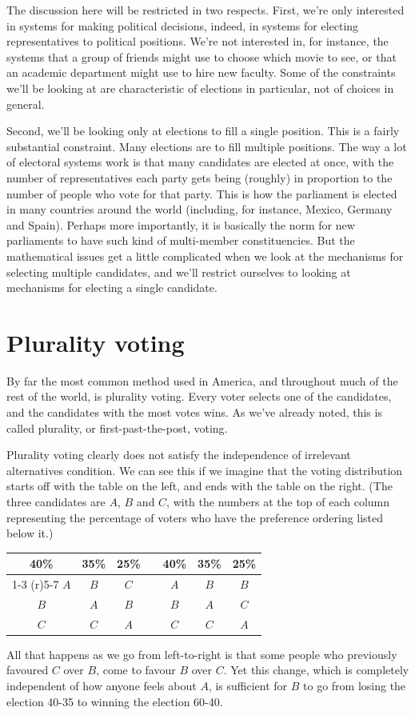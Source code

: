 \documentclass[openany]{book}
\begin{document}
The discussion here will be restricted in two respects. First, we're only interested in systems for making political decisions, indeed, in systems for electing representatives to political positions. We're not interested in, for instance, the systems that a group of friends might use to choose which movie to see, or that an academic department might use to hire new faculty. Some of the constraints we'll be looking at are characteristic of elections in particular, not of choices in general.

Second, we'll be looking only at elections to fill a single position. This is a fairly substantial constraint. Many elections are to fill multiple positions. The way a lot of electoral systems work is that many candidates are elected at once, with the number of representatives each party gets being (roughly) in proportion to the number of people who vote for that party. This is how the parliament is elected in many countries around the world (including, for instance, Mexico, Germany and Spain). Perhaps more importantly, it is basically the norm for new parliaments to have such kind of multi-member constituencies. But the mathematical issues get a little complicated when we look at the mechanisms for selecting multiple candidates, and we'll restrict ourselves to looking at mechanisms for electing a single candidate.

\section{Plurality voting}
By far the most common method used in America, and throughout much of the rest of the world, is plurality voting. Every voter selects one of the candidates, and the candidates with the most votes wins. As we've already noted, this is called plurality, or first-past-the-post, voting.

Plurality voting clearly does not satisfy the independence of irrelevant alternatives condition. We can see this if we imagine that the voting distribution starts off with the table on the left, and ends with the table on the right. (The three candidates are $A$, $B$ and $C$, with the numbers at the top of each column representing the percentage of voters who have the preference ordering listed below it.)

\begin{center}
\begin{tabular}{c c c p{100pt} c c c}
40\% & 35\% & 25\% & & 40\% & 35\% & 25\% \\
\cmidrule(r){1-3}
\cmidrule(r){5-7}
$A$ & $B$ & $C$ & & $A$ & $B$ & $B$ \\
$B$ & $A$ & $B$ & & $B$ & $A$ & $C$ \\
$C$ & $C$ & $A$ & & $C$ & $C$ & $A$
\end{tabular}
\end{center}
All that happens as we go from left-to-right is that some people who previously favoured $C$ over $B$, come to favour $B$ over $C$. Yet this change, which is completely independent of how anyone feels about $A$, is sufficient for $B$ to go from losing the election 40-35 to winning the election 60-40.
\end{document}
